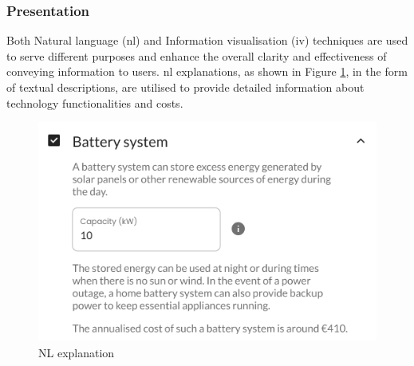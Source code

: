 \subsubsection{Presentation}

Both Natural language (\gls{nl}) and Information visualisation (\gls{iv}) techniques are used to serve different purposes and enhance the overall clarity and effectiveness of conveying information to users. 
\gls{nl} explanations, as shown in Figure \ref{fig:nl}, in the form of textual descriptions, are utilised to provide detailed information about technology functionalities and costs. 
\begin{figure}[h!]
  \centering
  \includegraphics[width=\textwidth]{Images/nl.png}
  \caption{NL explanation}
  \label{fig:nl}
\end{figure}

